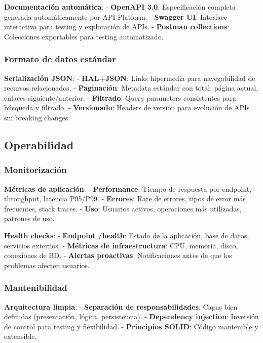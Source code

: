 \documentclass[12pt,a4paper,oneside]{report}
\begin{document}
\textbf{Documentación automática}: - \textbf{OpenAPI 3.0}:
Especificación completa generada automáticamente por API Platform. -
\textbf{Swagger UI}: Interface interactiva para testing y exploración de
APIs. - \textbf{Postman collections}: Colecciones exportables para
testing automatizado.

\subsubsection{Formato de datos
estándar}\label{formato-de-datos-estuxe1ndar}

\textbf{Serialización JSON}: - \textbf{HAL+JSON}: Links hipermedia para
navegabilidad de recursos relacionados. - \textbf{Paginación}: Metadata
estándar con total, página actual, enlaces siguiente/anterior. -
\textbf{Filtrado}: Query parameters consistentes para búsqueda y
filtrado. - \textbf{Versionado}: Headers de versión para evolución de
APIs sin breaking changes.

\subsection{Operabilidad}\label{operabilidad}

\subsubsection{Monitorización}\label{monitorizaciuxf3n}

\textbf{Métricas de aplicación}: - \textbf{Performance}: Tiempo de
respuesta por endpoint, throughput, latencia P95/P99. -
\textbf{Errores}: Rate de errores, tipos de error más frecuentes, stack
traces. - \textbf{Uso}: Usuarios activos, operaciones más utilizadas,
patrones de uso.

\textbf{Health checks}: - \textbf{Endpoint /health}: Estado de la
aplicación, base de datos, servicios externos. - \textbf{Métricas de
infraestructura}: CPU, memoria, disco, conexiones de BD. -
\textbf{Alertas proactivas}: Notificaciones antes de que los problemas
afecten usuarios.

\subsubsection{Mantenibilidad}\label{mantenibilidad}

\textbf{Arquitectura limpia}: - \textbf{Separación de
responsabilidades}: Capas bien definidas (presentación, lógica,
persistencia). - \textbf{Dependency injection}: Inversión de control
para testing y flexibilidad. - \textbf{Principios SOLID}: Código
mantenible y extensible.
\end{document}
